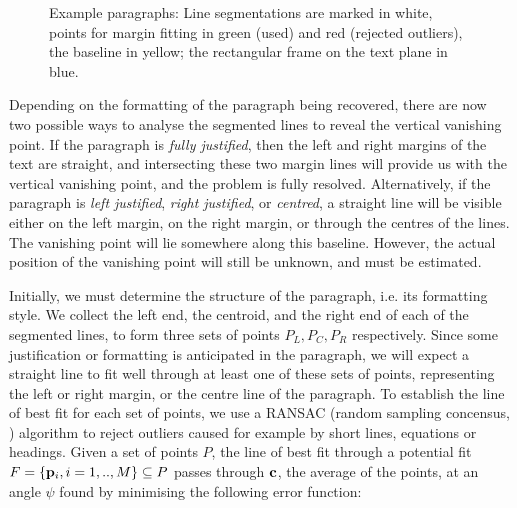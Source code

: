 \begin{figure}[t]
\centering
\begin{center}
\hspace{2mm}
\end{center}
\vspace*{0mm}
\caption{Example paragraphs: 
Line segmentations are marked in white, points for margin fitting in green
(used) and red (rejected outliers), the baseline in yellow;
the rectangular frame on the text plane in blue.}
\label{linesegfig}
\label{summaryfig}
\end{figure}



Depending on the formatting of the paragraph being recovered, there are now two
possible ways to analyse the segmented lines to reveal the vertical vanishing
point.  If the paragraph is {\em fully justified}, then the left and right
margins of the text are straight, and intersecting these two margin lines will
provide us with the vertical vanishing point, and the problem is fully resolved.
Alternatively, if the paragraph is {\em left justified}, {\em right justified},
or {\em centred},
a straight line will be visible either on the left margin, on the right margin,
or through the centres of the lines.  The vanishing point will lie somewhere
along this baseline.  However, the actual position of the vanishing point will
still be unknown, and must be estimated.


Initially, we must determine the structure of the paragraph, i.e. its 
formatting style. We collect the left end, the centroid, and the right end of each
of the segmented lines, to form three sets of points $P_L,P_C,P_R$ respectively.
Since some justification or formatting is anticipated in the paragraph, we will
expect a straight line to fit well through at least one of these sets of points,
representing the left or right margin, or the centre line of the paragraph.  To
establish the line of best fit for each set of points, we use a RANSAC (random
sampling concensus, \cite{bolles81ransac-based}) algorithm to reject outliers
caused for example by short lines, equations or headings.  Given a set of points
$P$, the line of best fit through a potential fit 
$F=\{{ \bf p }_i, i=1,..,M\}\subseteq P$ passes through ${ \bf c }$, the average
of the points, at an angle $\psi$ found by minimising the following error function:

